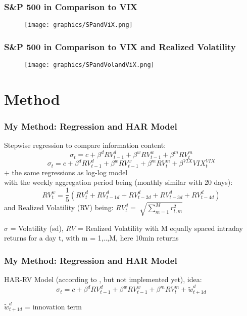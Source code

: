 \documentclass[aspectratio=169]{beamer}
\begin{document}
\begin{frame}
\frametitle{S\&P 500 in Comparison to VIX}
	\begin{figure}
	\centering
	\texttt{[image: graphics/SPandViX.png]}
	\end{figure}
\end{frame}

\begin{frame}
\frametitle{S\&P 500 in Comparison to VIX and Realized Volatility}
	\begin{figure}
	\centering
	\texttt{[image: graphics/SPandVolandViX.png]}
	\end{figure}
\end{frame}

\section{Method}


\begin{frame}
\frametitle{My Method: Regression and HAR Model}
%
Stepwise regression to compare information content:
	\begin{equation}
	\sigma_{t} = c + \beta^{d} RV^{d}_{t-1} + \beta^{w} RV^{w}_{t-1} + \beta^{m} RV^{m}_{t} 
	\end{equation}	
	\begin{equation}
	\sigma_{t} = c + \beta^{d} RV^{d}_{t-1} + \beta^{w} RV^{w}_{t-1} + \beta^{m} RV^{m}_{t} + \beta^{VIX} VIX^{VIX}_{t}
	\end{equation}
$+$ the same regressions as log-log model\\
with the weekly aggregation period being (monthly similar with 20 days):
	\begin{equation*}
	RV^{w}_{t} = \frac{1}{5} (RV^{d}_{t} + RV^{d}_{t-1d} + RV^{d}_{t-2d} + RV^{d}_{t-3d} + RV^{d}_{t-4d})
	\end{equation*}
and Realized Volatility (RV) being: $	RV^{d}_{t} = \sqrt[]{\sum_{m=1}^{M} r^{2}_{t,m}} $\\
%
\begin{footnotesize}
$\sigma$ = Volatility (sd), $RV$ = Realized Volatility with M equally spaced intraday returns for a day t, with m = 1,..,M, here 10min returns
\end{footnotesize}
%
\end{frame}

\begin{frame}
\frametitle{My Method: Regression and HAR Model}
HAR-RV Model (according to \textcite{corsi2009}, but not implemented yet), idea:
\begin{equation}
	\sigma_{t} = c + \beta^{d} RV^{d}_{t-1} + \beta^{w} RV^{w}_{t-1} + \beta^{m} RV^{m}_{t} + \tilde{w}^{d}_{t+1d}
	\end{equation}	
\begin{footnotesize}
$\tilde{w}^{d}_{t+1d}$ = innovation term
\end{footnotesize}
\end{frame}
\end{document}
